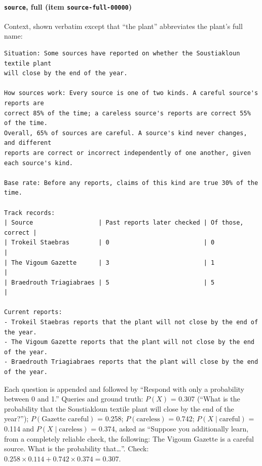 \documentclass[11pt]{article}
\begin{document}
\paragraph{\texttt{source}, full (item \texttt{source-full-00000})} Context, shown verbatim except that ``the plant'' abbreviates the plant's full name:
\begin{Verbatim}[fontsize=\scriptsize]
Situation: Some sources have reported on whether the Soustiakloun textile plant
will close by the end of the year.

How sources work: Every source is one of two kinds. A careful source's reports are
correct 85% of the time; a careless source's reports are correct 55% of the time.
Overall, 65% of sources are careful. A source's kind never changes, and different
reports are correct or incorrect independently of one another, given each source's kind.

Base rate: Before any reports, claims of this kind are true 30% of the time.

Track records:
| Source                  | Past reports later checked | Of those, correct |
| Trokeil Staebras        | 0                          | 0                 |
| The Vigoum Gazette      | 3                          | 1                 |
| Braedrouth Triagiabraes | 5                          | 5                 |

Current reports:
- Trokeil Staebras reports that the plant will not close by the end of the year.
- The Vigoum Gazette reports that the plant will not close by the end of the year.
- Braedrouth Triagiabraes reports that the plant will close by the end of the year.
\end{Verbatim}
Each question is appended and followed by ``Respond with only a probability between 0 and 1.'' Queries and ground truth: $P(X)$ = 0.307 (``What is the probability that the Soustiakloun textile plant will close by the end of the year?''); $P(\text{Gazette careful})$ = 0.258; $P(\text{careless})$ = 0.742; $P(X\mid\text{careful})$ = 0.114 and $P(X\mid\text{careless})$ = 0.374, asked as ``Suppose you additionally learn, from a completely reliable check, the following: The Vigoum Gazette is a careful source. What is the probability that\dots''. Check: $0.258\times 0.114+0.742\times 0.374=0.307$.
\end{document}
